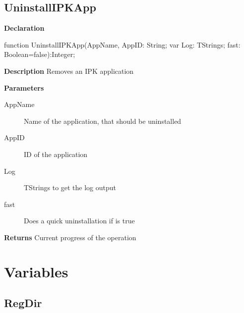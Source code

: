 \documentclass{report}
\newif\ifpdf
\begin{document}
\subsection*{UninstallIPKApp}
\fi
\label{ipkhandle-UninstallIPKApp}
\begin{list}{}{
\setlength{\itemindent}{0cm}
\setlength{\listparindent}{0cm}
\setlength{\leftmargin}{\evensidemargin}
\addtolength{\leftmargin}{\tmplength}
\settowidth{\labelsep}{X}
\addtolength{\leftmargin}{\labelsep}
\setlength{\labelwidth}{\tmplength}
}
\item[\textbf{Declaration}\hfill]
\ifpdf
\begin{flushleft}
\fi
\begin{ttfamily}
function UninstallIPKApp(AppName, AppID: String; var Log: TStrings; fast: Boolean=false):Integer;\end{ttfamily}

\ifpdf
\end{flushleft}
\fi

\par
\item[\textbf{Description}]
Removes an IPK application     \par
\item[\textbf{Parameters}]
\begin{description}
\item[AppName] Name of the application, that should be uninstalled
\item[AppID] ID of the application
\item[Log] TStrings to get the log output
\item[fast] Does a quick uninstallation if is true
\end{description}
\item[\textbf{Returns}]Current progress of the operation


\end{list}
\section{Variables}
\ifpdf
\subsection*{\large{\textbf{RegDir}}\normalsize\hspace{1ex}\hrulefill}
\else
\end{document}

